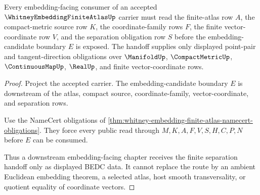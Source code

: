 \begin{theorem}
\label{thm:whitney-embedding-finite-atlas-separation-handoff}
Every embedding-facing consumer of an accepted $\WhitneyEmbeddingFiniteAtlasUp$ carrier must read the finite-atlas row $A$, the compact-metric source row $K$, the coordinate-family rows $F$, the finite vector-coordinate row $V$, and the separation obligation row $S$ before the embedding-candidate boundary $E$ is exposed. The handoff supplies only displayed point-pair and tangent-direction obligations over $\ManifoldUp$, $\CompactMetricUp$, $\ContinuousMapUp$, $\RealUp$, and finite vector-coordinate rows.
\end{theorem}
\begin{proof}
Project the accepted carrier. The embedding-candidate boundary $E$ is downstream of the atlas, compact source, coordinate-family, vector-coordinate, and separation rows.

Use the NameCert obligations of \autoref{thm:whitney-embedding-finite-atlas-namecert-obligations}. They force every public read through $M,K,A,F,V,S,H,C,P,N$ before $E$ can be consumed.

Thus a downstream embedding-facing chapter receives the finite separation handoff only as displayed BEDC data. It cannot replace the route by an ambient Euclidean embedding theorem, a selected atlas, host smooth transversality, or quotient equality of coordinate vectors.
\end{proof}


